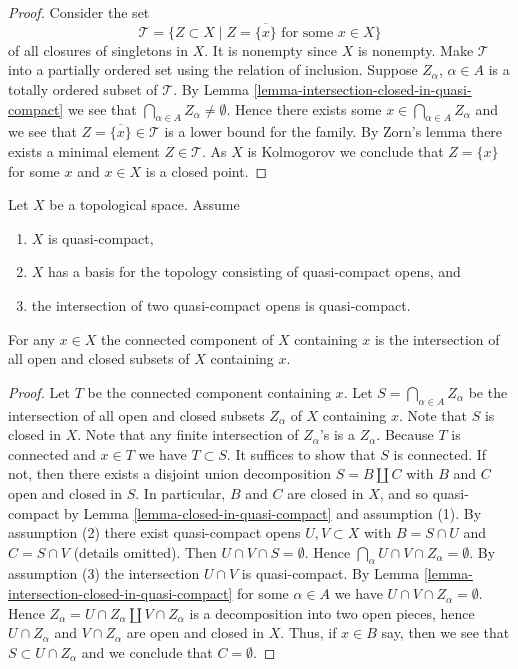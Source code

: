 \begin{proof}
Consider the set
$$
\mathcal{T} =
\{Z \subset X \mid Z = \overline{\{x\}} \text{ for some }x \in X\}
$$
of all closures of singletons in $X$. It is nonempty since $X$ is
nonempty. Make $\mathcal{T}$ into a
partially ordered set using the relation of inclusion. 
Suppose $Z_\alpha$, $\alpha \in A$ is a totally ordered subset of $\mathcal{T}$.
By Lemma \ref{lemma-intersection-closed-in-quasi-compact} we see
that $\bigcap_{\alpha \in A} Z_\alpha \not = \emptyset$. Hence there exists
some $x \in \bigcap_{\alpha \in A} Z_\alpha$ and we see that
$Z = \overline{\{x\}}\in \mathcal{T}$ is a lower bound for
the family. By Zorn's lemma there exists a minimal element
$Z \in \mathcal{T}$. As $X$ is Kolmogorov we conclude that
$Z = \{x\}$ for some $x$ and $x \in X$ is a closed point.
\end{proof}

\begin{lemma}
\label{lemma-connected-component-intersection}
Let $X$ be a topological space.
Assume
\begin{enumerate}
\item $X$ is quasi-compact,
\item $X$ has a basis for the topology consisting of quasi-compact opens, and
\item the intersection of two quasi-compact opens is quasi-compact.
\end{enumerate}
For any $x \in X$ the connected component of $X$ containing
$x$ is the intersection of all open and closed subsets
of $X$ containing $x$.
\end{lemma}

\begin{proof}
Let $T$ be the connected component containing $x$.
Let $S = \bigcap_{\alpha \in A} Z_\alpha$ be the intersection of all
open and closed subsets $Z_\alpha$ of $X$ containing $x$.
Note that $S$ is closed in $X$.
Note that any finite intersection of $Z_\alpha$'s is a $Z_\alpha$.
Because $T$ is connected and $x \in T$ we have $T \subset S$.
It suffices to show that $S$ is connected.
If not, then there exists a disjoint union decomposition
$S = B \coprod C$ with $B$ and $C$ open and closed in $S$.
In particular, $B$ and $C$ are closed in $X$, and so quasi-compact by
Lemma \ref{lemma-closed-in-quasi-compact} and assumption (1).
By assumption (2) there exist quasi-compact opens
$U, V \subset X$ with $B = S \cap U$ and $C = S \cap V$ (details omitted).
Then $U \cap V \cap S = \emptyset$.
Hence $\bigcap_\alpha U \cap V \cap Z_\alpha = \emptyset$.
By assumption (3) the intersection $U \cap V$ is quasi-compact.
By Lemma \ref{lemma-intersection-closed-in-quasi-compact}
for some $\alpha \in A$ we have $U \cap V \cap Z_\alpha = \emptyset$.
Hence $Z_\alpha = U \cap Z_\alpha \coprod V \cap Z_\alpha$
is a decomposition into two open pieces,
hence $U \cap Z_\alpha$ and $V \cap Z_\alpha$ are open and closed in $X$.
Thus, if $x \in B$ say, then we see that $S \subset U \cap Z_\alpha$
and we conclude that $C = \emptyset$.
\end{proof}

